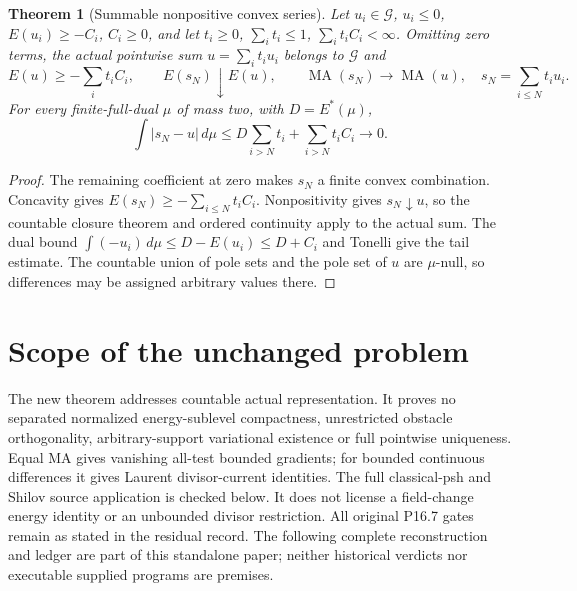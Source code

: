 \documentclass[11pt]{article}
\newtheorem{theorem}{Theorem}
\newcommand{\G}{\mathcal G}
\newcommand{\MA}{\operatorname{MA}}
\begin{document}
\begin{theorem}[Summable nonpositive convex series]
Let $u_i\in\G$, $u_i\leq0$, $E(u_i)\geq-C_i$, $C_i\geq0$, and let
$t_i\geq0$, $\sum_i t_i\leq1$, $\sum_it_iC_i<\infty$. Omitting zero
terms, the actual pointwise sum $u=\sum_it_iu_i$ belongs to $\G$ and
\[
 E(u)\geq-\sum_it_iC_i,\qquad
 E(s_N)\downarrow E(u),\qquad\MA(s_N)\to\MA(u),
 \quad s_N=\sum_{i\leq N}t_iu_i.
\]
For every finite-full-dual $\mu$ of mass two, with $D=E^*(\mu)$,
\[
 \int|s_N-u|\,d\mu
 \leq D\sum_{i>N}t_i+\sum_{i>N}t_iC_i\longrightarrow0.
\]
\end{theorem}
\begin{proof}
The remaining coefficient at zero makes $s_N$ a finite convex combination.
Concavity gives $E(s_N)\geq-\sum_{i\leq N}t_iC_i$. Nonpositivity gives
$s_N\downarrow u$, so the countable closure theorem and ordered continuity
apply to the actual sum. The dual bound
$\int(-u_i)\,d\mu\leq D-E(u_i)\leq D+C_i$ and Tonelli give the tail
estimate. The countable union of pole sets and the pole set of $u$ are
$\mu$-null, so differences may be assigned arbitrary values there.
\end{proof}

\section*{Scope of the unchanged problem}
The new theorem addresses countable actual representation. It proves no
separated normalized energy-sublevel compactness, unrestricted obstacle
orthogonality, arbitrary-support variational existence or full pointwise
uniqueness. Equal MA gives vanishing all-test bounded gradients; for bounded
continuous differences it gives Laurent divisor-current identities.
The full classical-psh and Shilov source application is checked below.
It does not license a field-change energy identity or an unbounded divisor
restriction. All original P16.7 gates remain as stated in the residual record.
The following complete reconstruction and ledger are part of this standalone
paper; neither historical verdicts nor executable supplied programs are premises.

\end{document}
